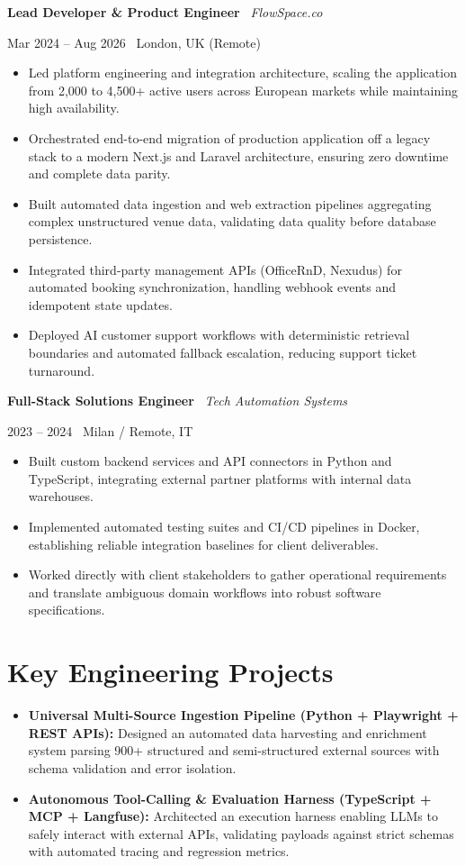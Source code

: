 \documentclass[a4paper,10pt]{article}
\newcommand{\role}[4]{%
  \vspace{2pt}\noindent
  \begin{minipage}[t]{0.70\textwidth}\raggedright\textbf{#1} \textbullet\ \textit{#3}\end{minipage}%
  \hfill
  \begin{minipage}[t]{0.28\textwidth}\raggedleft\footnotesize\color{gray}#2 \textbullet\ #4\end{minipage}%
  \vspace{1pt}%
}
\begin{document}
\vspace{3pt}
\role{Lead Developer \& Product Engineer}{Mar 2024 -- Aug 2026}{FlowSpace.co}{London, UK (Remote)}
\begin{itemize}
  \item Led platform engineering and integration architecture, scaling the application from 2,000 to 4,500+ active users across European markets while maintaining high availability.
  \item Orchestrated end-to-end migration of production application off a legacy stack to a modern Next.js and Laravel architecture, ensuring zero downtime and complete data parity.
  \item Built automated data ingestion and web extraction pipelines aggregating complex unstructured venue data, validating data quality before database persistence.
  \item Integrated third-party management APIs (OfficeRnD, Nexudus) for automated booking synchronization, handling webhook events and idempotent state updates.
  \item Deployed AI customer support workflows with deterministic retrieval boundaries and automated fallback escalation, reducing support ticket turnaround.
\end{itemize}

\vspace{3pt}
\role{Full-Stack Solutions Engineer}{2023 -- 2024}{Tech Automation Systems}{Milan / Remote, IT}
\begin{itemize}
  \item Built custom backend services and API connectors in Python and TypeScript, integrating external partner platforms with internal data warehouses.
  \item Implemented automated testing suites and CI/CD pipelines in Docker, establishing reliable integration baselines for client deliverables.
  \item Worked directly with client stakeholders to gather operational requirements and translate ambiguous domain workflows into robust software specifications.
\end{itemize}

\section{Key Engineering Projects}
\begin{itemize}
  \item \textbf{Universal Multi-Source Ingestion Pipeline (Python + Playwright + REST APIs):} Designed an automated data harvesting and enrichment system parsing 900+ structured and semi-structured external sources with schema validation and error isolation.
  \item \textbf{Autonomous Tool-Calling \& Evaluation Harness (TypeScript + MCP + Langfuse):} Architected an execution harness enabling LLMs to safely interact with external APIs, validating payloads against strict schemas with automated tracing and regression metrics.
\end{itemize}
\end{document}
